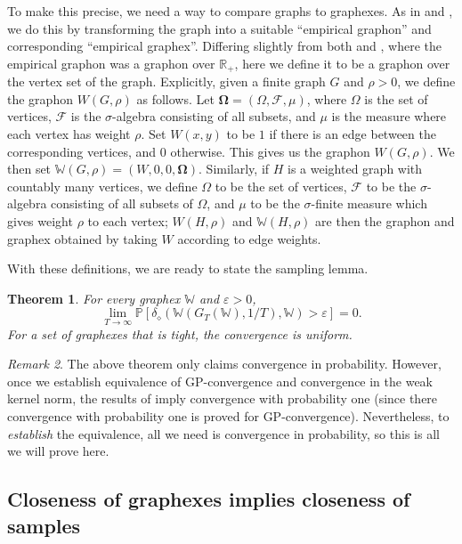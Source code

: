 \documentclass{amsart}
\numberwithin{equation}{section}
\numberwithin{figure}{section}
\newtheorem{theorem}{Theorem}[section]
\theoremstyle{definition}
\theoremstyle{remark}
\newtheorem{remark}[theorem]{Remark}
\newcommand{\bOmega}{{\mathbf{\Omega}}}
\newcommand{\RR}{\mathbb{R}}
\newcommand{\PP}{\mathbb{P}}
\newcommand{\cW}{\mathbb{W}}
\newcommand{\cF}{\mathcal{F}}
\def\delGP{\delta_\diamond}
\begin{document}
To make this precise, we need a way to compare graphs to graphexes. As in
\cite{BCCH16} and \cite{BCCV17}, we do this by transforming the graph into a
suitable ``empirical graphon'' and corresponding ``empirical graphex''.
Differing slightly from both \cite{BCCH16} and \cite{BCCV17}, where the
empirical graphon was a graphon over $\RR_+$, here we define it to be a
graphon over the vertex set of the graph. Explicitly, given a finite graph
$G$ and $\rho>0$, we define the graphon $W(G,\rho)$ as follows. Let
$\bOmega=(\Omega,\cF,\mu)$, where $\Omega$ is the set of vertices, $\cF$ is
the $\sigma$-algebra consisting of all subsets, and $\mu$ is the measure
where each vertex has weight $\rho$. Set $W(x,y)$ to be $1$ if there is an
edge between the corresponding vertices, and $0$ otherwise. This gives us the
graphon $W(G,\rho)$. We then set $\cW(G,\rho)=(W,0,0,\bOmega)$. Similarly, if
$H$ is a weighted graph with countably many vertices, we define $\Omega$ to
be the set of vertices, $\cF$ to be the $\sigma$-algebra consisting of all
subsets of $\Omega$, and $\mu$ to be the $\sigma$-finite measure which gives
weight $\rho$ to each vertex; $W(H,\rho)$ and $\cW(H,\rho)$ are then the
graphon and graphex obtained by taking $W$ according to edge weights.

With these definitions, we are ready to state the sampling lemma.

\begin{theorem} \label{theoremsamplesconverge}
For every graphex $\cW$ and $\varepsilon>0$,
\[\lim\limits_{T \rightarrow \infty}\PP[\delGP(\cW(G_{T}(\cW),1/T),\cW)>\varepsilon]= 0.
\]
For a set of graphexes that is tight, the convergence is uniform.
\end{theorem}

\begin{remark}
The above theorem only claims convergence in probability. However, once we
establish equivalence of GP-convergence and convergence in the weak kernel
norm, the results of \cite{JANSON17} imply convergence with probability one
(since there convergence with probability one is proved for GP-convergence).
Nevertheless, to \emph{establish} the equivalence, all we need is convergence
in probability, so this is all we will prove here.
\end{remark}

\subsection{Closeness of graphexes implies closeness of samples}
\label{sec:close-GR-close-Smpl}
\end{document}
